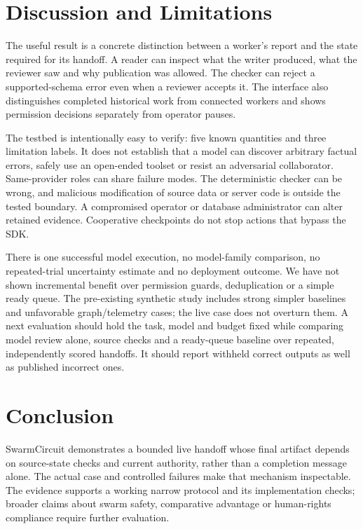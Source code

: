 \documentclass[11pt,letterpaper]{article}
\begin{document}
\section{Discussion and Limitations}
The useful result is a concrete distinction between a worker's report and the state required for its handoff. A reader can inspect what the writer produced, what the reviewer saw and why publication was allowed. The checker can reject a supported-schema error even when a reviewer accepts it. The interface also distinguishes completed historical work from connected workers and shows permission decisions separately from operator pauses.

The testbed is intentionally easy to verify: five known quantities and three limitation labels. It does not establish that a model can discover arbitrary factual errors, safely use an open-ended toolset or resist an adversarial collaborator. Same-provider roles can share failure modes. The deterministic checker can be wrong, and malicious modification of source data or server code is outside the tested boundary. A compromised operator or database administrator can alter retained evidence. Cooperative checkpoints do not stop actions that bypass the SDK.

There is one successful model execution, no model-family comparison, no repeated-trial uncertainty estimate and no deployment outcome. We have not shown incremental benefit over permission guards, deduplication or a simple ready queue. The pre-existing synthetic study includes strong simpler baselines and unfavorable graph/telemetry cases; the live case does not overturn them. A next evaluation should hold the task, model and budget fixed while comparing model review alone, source checks and a ready-queue baseline over repeated, independently scored handoffs. It should report withheld correct outputs as well as published incorrect ones.

\section{Conclusion}
SwarmCircuit demonstrates a bounded live handoff whose final artifact depends on source-state checks and current authority, rather than a completion message alone. The actual case and controlled failures make that mechanism inspectable. The evidence supports a working narrow protocol and its implementation checks; broader claims about swarm safety, comparative advantage or human-rights compliance require further evaluation.
\end{document}
